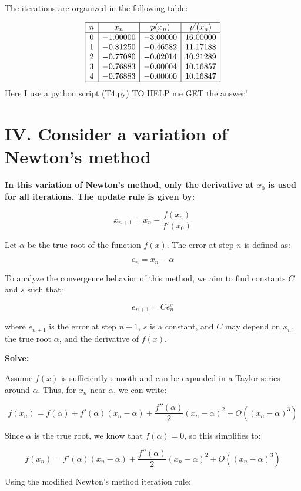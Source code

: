 \documentclass[a4paper]{article}
\begin{document}
The iterations are organized in the following table:

\[
\begin{array}{|c|c|c|c|}
\hline
n & x_n & p(x_n) & p'(x_n) \\
\hline
0&-1.00000&-3.00000&16.00000\\
1&-0.81250&-0.46582&11.17188\\
2&-0.77080&-0.02014&10.21289\\
3&-0.76883&-0.00004&10.16857\\
4&-0.76883&-0.00000&10.16847\\
\hline
\end{array}
\]
Here I use a python script (T4.py) TO HELP   me GET the answer!
\section*{IV. Consider a variation of Newton’s method}

\textbf{In this variation of Newton’s method, only the derivative at \( x_0 \) is used for all iterations. The update rule is given by:}

\[
x_{n+1} = x_n - \frac{f(x_n)}{f'(x_0)}
\]

Let \( \alpha \) be the true root of the function \( f(x) \). The error at step \( n \) is defined as:

\[
e_n = x_n - \alpha
\]

To analyze the convergence behavior of this method, we aim to find constants \( C \) and \( s \) such that:

\[
e_{n+1} = C e_n^s
\]

where \( e_{n+1} \) is the error at step \( n+1 \), \( s \) is a constant, and \( C \) may depend on \( x_n \), the true root \( \alpha \), and the derivative of \( f(x) \).

\textbf{Solve:}

Assume \( f(x) \) is sufficiently smooth and can be expanded in a Taylor series around \( \alpha \). Thus, for \( x_n \) near \( \alpha \), we can write:

\[
f(x_n) = f(\alpha) + f'(\alpha)(x_n - \alpha) + \frac{f''(\alpha)}{2}(x_n - \alpha)^2 + O((x_n - \alpha)^3)
\]

Since \( \alpha \) is the true root, we know that \( f(\alpha) = 0 \), so this simplifies to:

\[
f(x_n) = f'(\alpha)(x_n - \alpha) + \frac{f''(\alpha)}{2}(x_n - \alpha)^2 + O((x_n - \alpha)^3)
\]


Using the modified Newton’s method iteration rule:
\end{document}
